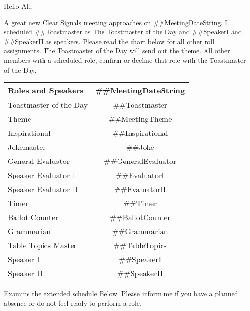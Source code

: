 \documentclass{article}
\newcommand{\meetingDateString}{##MeetingDateString}
\newcommand{\meetingTheme}{##MeetingTheme}
\newcommand{\toastmaster}{##Toastmaster}
\newcommand{\tableTopics}{##TableTopics}
\newcommand{\generalEvaluator}{##GeneralEvaluator}
\newcommand{\evaluatorI}{##EvaluatorI}
\newcommand{\evaluatorII}{##EvaluatorII}
\newcommand{\speakerI}{##SpeakerI}
\newcommand{\speakerII}{##SpeakerII}
\newcommand{\grammarian}{##Grammarian}
\newcommand{\timer}{##Timer}
\newcommand{\inspirational}{##Inspirational}
\newcommand{\ballotCounter}{##BallotCounter}
\newcommand{\joke}{##Joke}
\begin{document}
 Hello All,
 
   A great new Clear Signals meeting approaches on \meetingDateString{}.  I scheduled \toastmaster{} as The Toastmaster of the Day and \speakerI{} and \speakerII{} as speakers.  Please read the chart below for all other roll assignments.  The Toastmaster of the Day will send out the theme.  All other members with a scheduled role, confirm or decline that role with the Toastmaster of the Day.   

  \begin{tabular}{ |l|c| }
    \hline
    Roles and Speakers & \meetingDateString{} \\
    \hline
    Toastmaster of the Day & \toastmaster{} \\
    \hline
    Theme & \meetingTheme{} \\
    \hline
    Inspirational & \inspirational{} \\
    \hline
    Jokemaster & \joke{} \\
    \hline
    General Evaluator & \generalEvaluator{} \\
    \hline
    Speaker Evaluator I & \evaluatorI{} \\
    \hline
    Speaker Evaluator II & \evaluatorII{} \\
    \hline
    Timer & \timer{} \\
    \hline
    Ballot Counter & \ballotCounter{} \\
    \hline
    Grammarian & \grammarian{} \\
    \hline
    Table Topics Master & \tableTopics{} \\
    \hline\hline
    Speaker I & \speakerI{} \\
    \hline
    Speaker II & \speakerII{} \\
    \hline
  \end{tabular}
  
  Examine the extended schedule Below.  Please inform me if you have a planned absence or do not feel ready to perform a role. 
  
\end{document}
